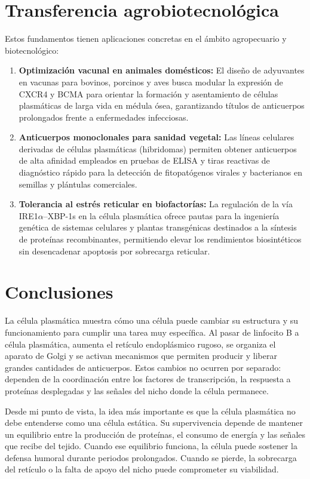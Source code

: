 \section{Transferencia agrobiotecnológica}
Estos fundamentos tienen aplicaciones concretas en el ámbito agropecuario y biotecnológico:
\begin{enumerate}
	\item \textbf{Optimización vacunal en animales domésticos:} El diseño de adyuvantes en vacunas para bovinos, porcinos y aves busca modular la expresión de CXCR4 y BCMA para orientar la formación y asentamiento de células plasmáticas de larga vida en médula ósea, garantizando títulos de anticuerpos prolongados frente a enfermedades infecciosas.
	\item \textbf{Anticuerpos monoclonales para sanidad vegetal:} Las líneas celulares derivadas de células plasmáticas (hibridomas) permiten obtener anticuerpos de alta afinidad empleados en pruebas de ELISA y tiras reactivas de diagnóstico rápido para la detección de fitopatógenos virales y bacterianos en semillas y plántulas comerciales.
	\item \textbf{Tolerancia al estrés reticular en biofactorías:} La regulación de la vía IRE1$\alpha$--XBP-1s en la célula plasmática ofrece pautas para la ingeniería genética de sistemas celulares y plantas transgénicas destinados a la síntesis de proteínas recombinantes, permitiendo elevar los rendimientos biosintéticos sin desencadenar apoptosis por sobrecarga reticular.
\end{enumerate}

\section{Conclusiones}
La célula plasmática muestra cómo una célula puede cambiar su estructura y su funcionamiento para cumplir una tarea muy específica. Al pasar de linfocito B a célula plasmática, aumenta el retículo endoplásmico rugoso, se organiza el aparato de Golgi y se activan mecanismos que permiten producir y liberar grandes cantidades de anticuerpos. Estos cambios no ocurren por separado: dependen de la coordinación entre los factores de transcripción, la respuesta a proteínas desplegadas y las señales del nicho donde la célula permanece.

Desde mi punto de vista, la idea más importante es que la célula plasmática no debe entenderse como una célula estática. Su supervivencia depende de mantener un equilibrio entre la producción de proteínas, el consumo de energía y las señales que recibe del tejido. Cuando ese equilibrio funciona, la célula puede sostener la defensa humoral durante periodos prolongados. Cuando se pierde, la sobrecarga del retículo o la falta de apoyo del nicho puede comprometer su viabilidad.

